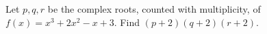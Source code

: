 Let $p,q,r$ be the complex roots, counted with multiplicity, of $f(x)=x^3+2x^2-x+3$. Find $(p+2)(q+2)(r+2)$.
